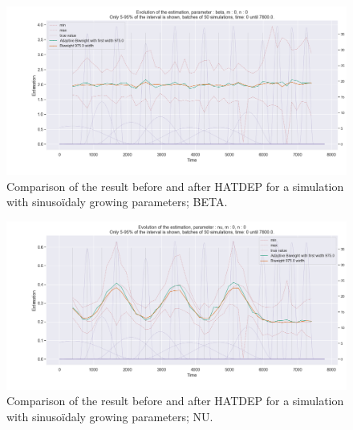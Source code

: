 \begin{figure}
\centering
\includegraphics[width = 0.90 \textwidth]{../imag/chap3/4_bis/Q.png}
\caption{Comparison of the result before and after HATDEP for a simulation with sinusoïdaly growing parameters; BETA.}
\label{fig:second_estimate_4_beta}
\end{figure}

\begin{figure}
\centering
\includegraphics[width = 0.90 \textwidth]{../imag/chap3/4_bis/R.png}
\caption{Comparison of the result before and after HATDEP for a simulation with sinusoïdaly growing parameters; NU.}
\label{fig:second_estimate_4_nu}
\end{figure}









